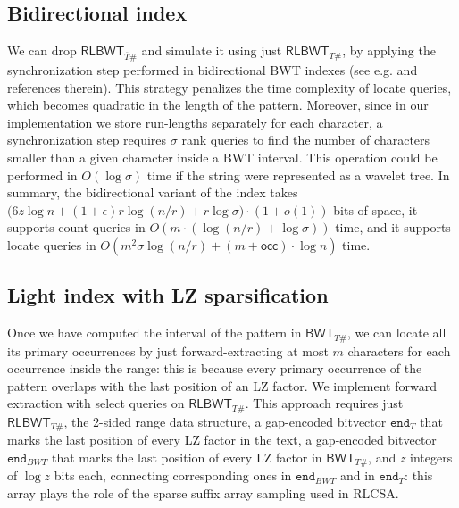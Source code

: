 \documentclass[a4paper,UKenglish]{lipics-v2016}
\newcommand{\REV}[1]{\ensuremath{\overline{#1}}}
\newcommand{\RLBWT}{\ensuremath{\mathsf{RLBWT}}}
\newcommand{\BWT}{\ensuremath{\mathsf{BWT}}}
\newcommand{\occ}
  {\ensuremath{\mathsf{occ}}}
\newcommand{\runs}{r}
\begin{document}
\subsection{Bidirectional index}

We can drop $\RLBWT_{\REV{T}\#}$ and simulate it using just $\RLBWT_{T\#}$, by applying the synchronization step performed in bidirectional BWT indexes (see e.g. \cite{belazzougui2014linear} and references therein). This strategy penalizes the time complexity of locate queries, which becomes quadratic in the length of the pattern. Moreover, since in our implementation we store run-lengths separately for each character, a synchronization step requires $\sigma$ rank queries to find the number of characters smaller than a given character inside a BWT interval. This operation could be performed in $O(\log{\sigma})$ time if the string were represented as a wavelet tree. In summary, the bidirectional variant of the index takes $\big( 6z\log{n} + (1+\epsilon)\runs\log(n/\runs) + \runs\log{\sigma} \big)\cdot(1+o(1))$ bits of space, it supports count queries in $O(m\cdot (\log(n/\runs)+\log{\sigma}))$ time, and it supports locate queries in $O( m^2\sigma\log(n/\runs)+ (m + \occ)\cdot \log{n})$ time. 












































\subsection{Light index with LZ sparsification}

Once we have computed the interval of the pattern in $\BWT_{T\#}$, we can locate all its primary occurrences by just forward-extracting at most $m$ characters for each occurrence inside the range: this is because every primary occurrence of the pattern overlaps with the last position of an LZ factor. We implement forward extraction with select queries on $\RLBWT_{T\#}$. This approach requires just $\RLBWT_{T\#}$, the 2-sided range data structure, a gap-encoded bitvector $\mathtt{end}_T$ that marks the last position of every LZ factor in the text, a gap-encoded bitvector $\mathtt{end}_{BWT}$ that marks the last position of every LZ factor in $\BWT_{T\#}$, and $z$ integers of $\log{z}$ bits each, connecting corresponding ones in $\mathtt{end}_{BWT}$ and in $\mathtt{end}_T$: this array plays the role of the sparse suffix array sampling used in RLCSA. 
\end{document}
